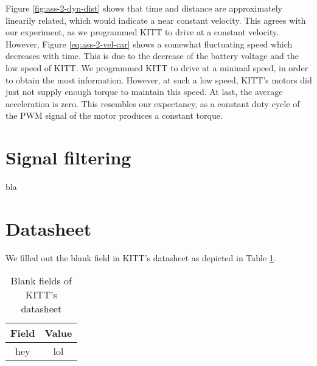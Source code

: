 \documentclass[11pt,titlepage]{report}
\begin{document}
Figure \ref{fig:ass-2-dyn-dist} shows that time and distance are approximately linearily related, which would indicate a near constant velocity. This agrees with our experiment, as we programmed KITT to drive at a constant velocity. However, Figure \ref{eq:ass-2-vel-car} shows a somewhat fluctuating speed which decreases with time. This is due to the decrease of the battery voltage and the low speed of KITT. We programmed KITT to drive at a minimal speed, in order to obtain the most information. However, at such a low speed, KITT's motors did just not supply enough torque to maintain this speed. At last, the average acceleration is zero. This resembles our expectancy, as a constant duty cycle of the PWM signal of the motor produces a constant torque.

\section{Signal filtering}
bla

\section{Datasheet}
We filled out the blank field in KITT's datasheet as depicted in Table \ref{tab:ass2-datasheet}.

\begin{table}[H]
	\centering
	\caption{Blank fields of KITT's datasheet}
	\label{tab:ass2-datasheet}
	\begin{tabular}{c c}
		\hline\hline
		Field & Value \\
		\hline
		hey & lol \\
		\hline
		\end{tabular}
\end{table}
\end{document}
